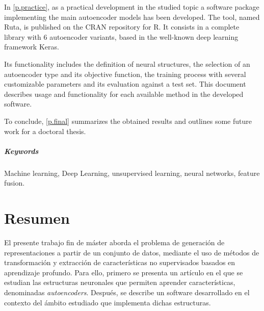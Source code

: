 \documentclass[oneside,openright,titlepage,numbers=noenddot,openany,headinclude,footinclude=true,
cleardoublepage=empty,abstractoff,BCOR=5mm,paper=a4,fontsize=12pt,main=spanish]{scrreprt}
\DeclareRobustCommand{\chaptertitle}[1]{\textls[80]{\scshape #1}}
\begin{document}
In \autoref{p.practice}, as a practical development in the studied topic a software package implementing the main autoencoder models has been developed. The tool, named Ruta,  is published on the CRAN repository for R. It consists in a complete library with 6 autoencoder variants, based in the well-known deep learning framework Keras.

Its functionality includes the definition of neural structures, the selection of an autoencoder type and its objective function, the training process with several customizable parameters and its evaluation against a test set. This document describes usage and functionality for each available method in the developed software.

To conclude, \autoref{p.final} summarizes the obtained results and outlines some future work for a doctoral thesis. 

\paragraph{Keywords} Machine learning, Deep Learning, unsupervised learning, neural networks, feature fusion.

\chapter*{Resumen}
\addcontentsline{toc}{chapter}{\chaptertitle{resumen}}

El presente trabajo fin de máster aborda el problema de generación de representaciones a partir de un conjunto de datos, mediante el uso de métodos de transformación y extracción de características no supervisados basados en aprendizaje profundo. Para ello, primero se presenta un artículo en el que se estudian las estructuras neuronales que permiten aprender características, denominadas \textit{autoencoders}. Después, se describe un software desarrollado en el contexto del ámbito estudiado que implementa dichas estructuras.
\end{document}
